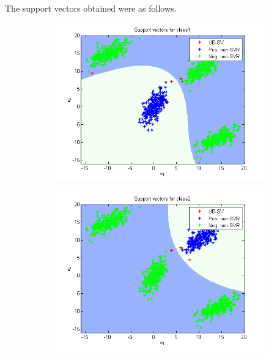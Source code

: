 \documentclass{article}
\begin{document}
The support vectors obtained were as follows.
\begin{figure}
\begin{subfigure}{.5\textwidth}
  \centering
  \includegraphics[width=.8\linewidth]{Classification/1a/c_poly/sv1}
 
\end{subfigure}%
\begin{subfigure}{.5\textwidth}
  \centering
  \includegraphics[width=.8\linewidth]{Classification/1a/c_poly/sv2}
  
\end{subfigure}
\end{figure}
\end{document}
